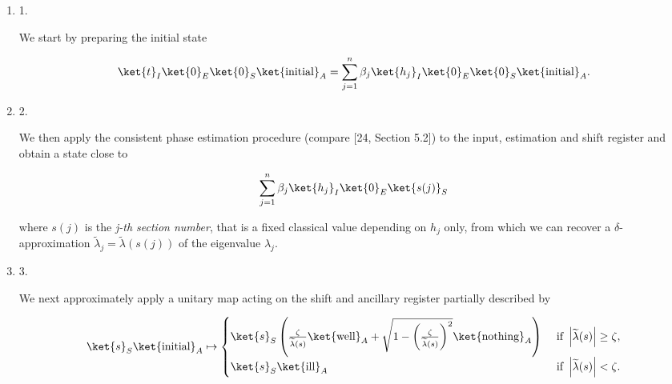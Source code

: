 \documentclass[10pt,a4paper]{article}
\begin{document}
\begin{enumerate}


\item[] 
1. 


We start by preparing the initial state\par


\[\begin{gathered}
\ket{t}_{I}\ket{0}_{E}\ket{0}_{S}\ket{\text{initial}}_{A}=\sum_{j=1}^{n}\beta_{j}\ket{h_{j}}_{I}\ket{0}_{E}\ket{0}_{S}\ket{\text{initial}}_{A}.
\end{gathered}\]





\item[] 
2. 


We then apply the consistent phase estimation procedure (compare [24, Section 5.2]) to the input, estimation and shift register and obtain a state close to\par


\[\begin{gathered}
\displaystyle\sum_{j=1}^{n}\beta_{j}\ket{h_{j}}_{I}\ket{0}_{E}\ket{s(j)}_{S}
\end{gathered}\]


where $s(j)$ is the \emph{j-th section number}, that is a fixed classical value depending on $h_{j}$ only, from which we can recover a $\delta$-approximation $\widetilde{\lambda}_{j}=\widetilde{\lambda}(s(j))$ of the eigenvalue $\lambda_{j}$.\par





\item[] 
3. 


We next approximately apply a unitary map acting on the shift and ancillary register partially described by\par


\[\begin{gathered}
\displaystyle\ket{s}_{S}\ket{\text{initial}}_{A}\mapsto\begin{cases}\ket{s}_{S}\left(\frac{\zeta}{\widetilde{\lambda}(s)}\ket{\text{well}}_{A}+\sqrt{1-\left(\frac{\zeta}{\widetilde{\lambda}(s)}\right)^{2}}\ket{\text{nothing}}_{A}\right)&\text{ if }\left|\widetilde{\lambda}(s)\right|\geq\zeta,\\
\ket{s}_{S}\ket{\text{ill}}_{A}&\text{ if }\left|\widetilde{\lambda}(s)\right|<\zeta.\end{cases}
\end{gathered}\]






\end{enumerate}
\end{document}
